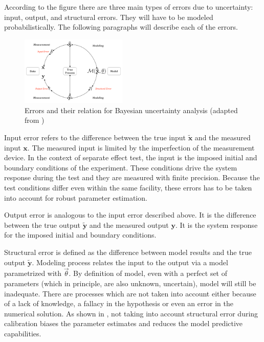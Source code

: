 \documentclass[11pt,titlepage]{article}
\begin{document}
According to the figure there are three main types of errors due to uncertainty: input, output, and structural errors. 
They will have to be modeled probabilistically.
The following paragraphs will describe each of the errors.
\begin{figure}[htbp]
	\centering
	\includegraphics[width=0.45\textwidth]{HuardMailhot.pdf}
	\caption{Errors and their relation for Bayesian uncertainty analysis (adapted from \cite{HuardMailhot2006})}
	\label{fig:HuardMailhot}
\end{figure}

Input error refers to the difference between the true input $\mathbf{\tilde{x}}$ and the measured input $\mathbf{x}$. 
The measured input is limited by the imperfection of the measurement device. 
In the context of separate effect test, the input is the imposed initial and boundary conditions of the experiment. 
These conditions drive the system response during the test and they are measured with finite precision.
Because the test conditions differ even within the same facility, these errors has to be taken into account for robust parameter estimation.

Output error is analogous to the input error described above. 
It is the difference between the true output $\mathbf{\tilde{y}}$ and the measured output $\mathbf{y}$. 
It is the system response for the imposed initial and boundary conditions. 

Structural error is defined as the difference between model results and the true output $\mathbf{\tilde{y}}$. 
Modeling process relates the input to the output via a model parametrized with $\vec{\theta}$. 
By definition of model, even with a perfect set of parameters (which in principle, are also unknown, uncertain), model will still be inadequate. 
There are processes which are not taken into account either because of a lack of knowledge, a fallacy in the hypothesis or even an error in the numerical solution. 
As shown in \cite{KennedyOHagan2001}, not taking into account structural error during calibration biases the parameter estimates and reduces the model predictive capabilities.
\end{document}
